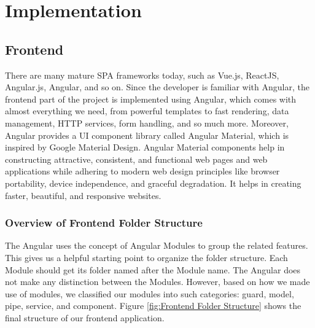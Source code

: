 \section{Implementation}
\label{sec:Implementation}

\subsection{Frontend}
There are many mature SPA frameworks today, such as Vue.js, ReactJS, Angular.js, Angular, and so on. Since the developer is familiar with Angular, the frontend part of the project is implemented using Angular, which comes with almost everything we need, from powerful templates to fast rendering, data management, HTTP services, form handling, and so much more. Moreover, Angular provides a UI component library called Angular Material,
which is inspired by Google Material Design. Angular Material components help in constructing attractive, consistent, and functional web pages and web applications while adhering to modern web design principles like browser portability, device independence, and graceful degradation. It helps in creating faster, beautiful, and responsive websites.


\subsubsection{Overview of Frontend Folder Structure}
The Angular uses the concept of Angular Modules to group the related features. This gives us a helpful starting point to organize the folder structure. Each Module should get its folder named after the Module name. The Angular does not make any distinction between the Modules. However, based on how we made use of modules, we classified our modules into such categories: guard, model, pipe, service, and component. Figure \ref{fig:Frontend Folder Structure} shows the final structure of our frontend application.

